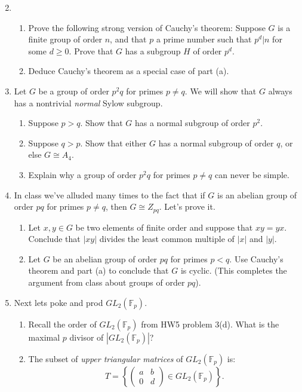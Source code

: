 \documentclass[11pt]{article}
\newcommand{\bF}{\mathbb{F}}
\begin{document}
\begin{enumerate}
  \setcounter{enumi}{1}
  \item{
  \begin{enumerate}
    \item Prove the following strong version of Cauchy's theorem:  Suppose $G$ is a finite group of order $n$, and that $p$ a prime number such that $p^d|n$ for some $d\ge0$.  Prove that $G$ has a subgroup $H$ of order $p^d$.
    \item Deduce Cauchy's theorem as a special case of part (a).
  \end{enumerate}
  }
  \item{
  Let $G$ be a group of order $p^2q$ for primes $p\not=q$.  We will show that $G$ always has a nontrivial \textit{normal} Sylow subgroup.
  \begin{enumerate}
    \item Suppose $p>q$.  Show that $G$ has a normal subgroup of order $p^2$.
    \item Suppose $q>p$.  Show that either $G$ has a normal subgroup of order $q$, or else $G\cong A_4$.
    \item Explain why a group of order $p^2q$ for primes $p\not=q$ can never be simple.
  \end{enumerate}
  }
  \item{In class we've alluded many times to the fact that if $G$ is an abelian group of order $pq$ for primes $p\not=q$, then $G\cong Z_{pq}$.  Let's prove it.
  \begin{enumerate}
    \item{
    Let $x,y\in G$ be two elements of finite order and suppose that $xy=yx$.  Conclude that $|xy|$ divides the least common multiple of $|x|$ and $|y|$.
    }
    \item{
    Let $G$ be an abelian group of order $pq$ for primes $p<q$.  Use Cauchy's theorem and part (a) to conclude that $G$ is cyclic.  (This completes the argument from class about groups of order $pq$).
    }
  \end{enumerate}
  }
  \item{
  Next lets poke and prod $GL_2(\bF_p)$.
  \begin{enumerate}
    \item{
    Recall the order of $GL_2(\bF_p)$ from HW5 problem 3(d).  What is the maximal $p$ divisor of $|GL_2(\bF_p)|$?
    }
    \item{
    The subset of \textit{upper triangular matrices} of $GL_2(\bF_p)$ is:
    \[T = \left\{\begin{pmatrix}a & b\\0 & d\end{pmatrix}\in GL_2(\bF_p)\right\}.\]
}
\end{enumerate}}
\end{enumerate}
\end{document}
